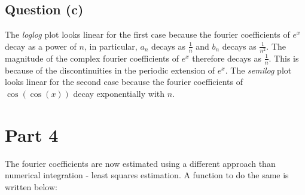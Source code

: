 \documentclass[11pt]{article}
\begin{document}
	

	
		
    \subsection{Question (c)}\label{question-c}

The \emph{loglog} plot looks linear for the first case because the
fourier coefficients of \(e^x\) decay as a power of \(n\), in
particular, \(a_n\) decays as \(\frac{1}{n}\) and \(b_n\) decays as
\(\frac{1}{n^2}\). The magnitude of the complex fourier coefficients of
\(e^x\) therefore decays as \(\frac{1}{n}\). This is because of the
discontinuities in the periodic extension of \(e^x\). The \emph{semilog}
plot looks linear for the second case because the fourier coefficients
of \(\cos(\cos(x))\) decay exponentially with \(n\).

	

	
		
    \section{Part 4}\label{part-4}

The fourier coefficients are now estimated using a different approach
than numerical integration - least squares estimation. A function to do
the same is written below:

	

	
		
\end{document}
